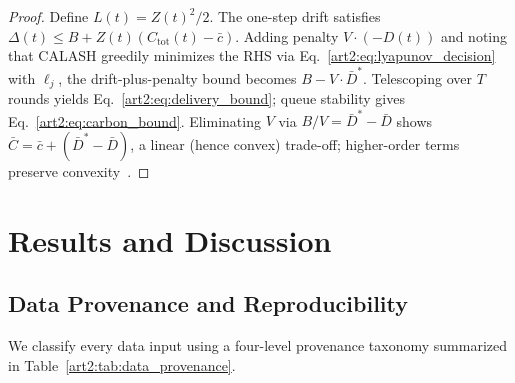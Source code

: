 \begin{proof}
Define $L(t) = Z(t)^2/2$.
The one-step drift satisfies $\Delta(t) \leq B + Z(t)(C_{\text{tot}}(t) - \bar{c})$.
Adding penalty $V \cdot (-D(t))$ and noting that CALASH greedily minimizes the RHS via Eq.~\eqref{art2:eq:lyapunov_decision} with $\ell_j$, the drift-plus-penalty bound becomes $B - V \cdot \bar{D}^*$.
Telescoping over $T$ rounds yields Eq.~\eqref{art2:eq:delivery_bound}; queue stability gives Eq.~\eqref{art2:eq:carbon_bound}.
Eliminating $V$ via $B/V = \bar{D}^* - \bar{D}$ shows $\bar{C} = \bar{c} + (\bar{D}^* - \bar{D})$, a linear (hence convex) trade-off; higher-order terms preserve convexity~\cite{neely2010lyapunov}.
\end{proof}

\FloatBarrier
\section{Results and Discussion}
\label{art2:sec:results}

\subsection{Data Provenance and Reproducibility}
\label{art2:sec:data_provenance}

We classify every data input using a four-level provenance taxonomy summarized in Table~\ref{art2:tab:data_provenance}.

